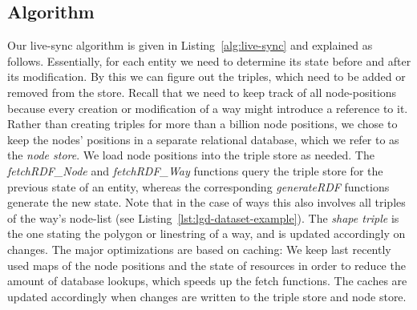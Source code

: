 \subsection{Algorithm}
Our live-sync algorithm is given in Listing~\ref{alg:live-sync} and explained
as follows. Essentially, for each entity we need to determine its state before
and after its modification. By this we can figure out the triples, which need to
be added or removed from the store.
Recall that we need to keep track of all node-positions because every
creation or modification of a way might introduce a reference to it.
Rather than creating triples for more than a billion node positions, we chose to
keep the nodes' positions in a separate relational database, which we refer to
as the \emph{node store}. We load node positions into the triple store as needed.
The \emph{fetchRDF\_Node} and \emph{fetchRDF\_Way} functions query the triple
store for the previous state of an entity, whereas the corresponding
\emph{generateRDF} functions generate the new state. Note that in the case of
ways this also involves all triples of the way's node-list (see
Listing~\ref{lst:lgd-dataset-example}). The \emph{shape triple} is the one stating the polygon or linestring of a way, and is updated accordingly on
changes.
The major optimizations are based on caching: We keep last recently used maps of
the node positions and the state of resources in order to reduce the amount of
database lookups, which speeds up the fetch functions.
The caches are updated accordingly when changes are written to the triple store
and node store.

